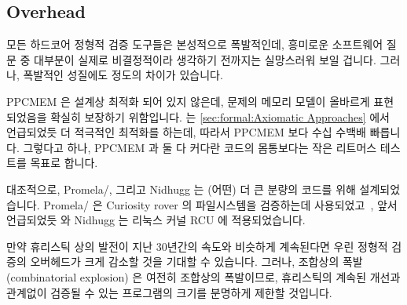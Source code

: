 \fi

\subsection{Overhead}
\label{sec:future:Overhead}

모든 하드코어 정형적 검증 도구들은 본성적으로 폭발적인데, 흥미로운 소프트웨어
질문 중 대부분이 실제로 비결정적이라 생각하기 전까지는 실망스러워 보일 겁니다.
그러나, 폭발적인 성질에도 정도의 차이가 있습니다.

PPCMEM 은 설계상 최적화 되어 있지 않은데, 문제의 메모리 모델이 올바르게
표현되었음을 확실히 보장하기 위함입니다.
 는
\cref{sec:formal:Axiomatic Approaches} 에서 언급되었듯 더 적극적인 최적화를
하는데, 따라서 PPCMEM 보다 수십 수백배 빠릅니다.
그렇다고 하나, PPCMEM 과  둘 다 커다란 코드의 몸통보다는 작은 리트머스
테스트를 목표로 합니다.

대조적으로, Promela/,  그리고 Nidhugg 는 (어떤) 더 큰 분량의
코드를 위해 설계되었습니다.
Promela/ 은 Curiosity rover 의 파일시스템을 검증하는데
사용되었고~\cite{DBLP:journals/amai/GroceHHJX14}, 앞서 언급되었듯  와
Nidhugg 는 리눅스 커널 RCU 에 적용되었습니다.

\iffalse

Almost all hard-core formal-verification tools are exponential
in nature, which might seem discouraging until you consider that
many of the most interesting software questions are in fact undecidable.
However, there are differences in degree, even among exponentials.

PPCMEM by design is unoptimized, in order to provide greater assurance
that the memory models of interest are accurately represented.
The \co{herd} tool optimizes more aggressively, as described in
\cref{sec:formal:Axiomatic Approaches}, and is thus orders of magnitude
faster than PPCMEM\@.
Nevertheless, both PPCMEM and \co{herd} target very small litmus tests
rather than larger bodies of code.

In contrast, Promela/\co{spin}, \co{cbmc}, and Nidhugg are designed for
(somewhat) larger bodies of code.
Promela/\co{spin} was used to verify the Curiosity rover's
filesystem~\cite{DBLP:journals/amai/GroceHHJX14} and, as noted earlier,
both \co{cbmc} and Nidhugg were appled to Linux-kernel RCU\@.

\fi

만약 휴리스틱 상의 발전이 지난 30년간의 속도와 비슷하게 계속된다면 우린 정형적
검증의 오버헤드가 크게 감소할 것을 기대할 수 있습니다.
그러나, 조합상의 폭발 (combinatorial explosion) 은 여전히 조합상의 폭발이므로,
휴리스틱의 계속된 개선과 관계없이 검증될 수 있는 프로그램의 크기를 분명하게
제한할 것입니다.

